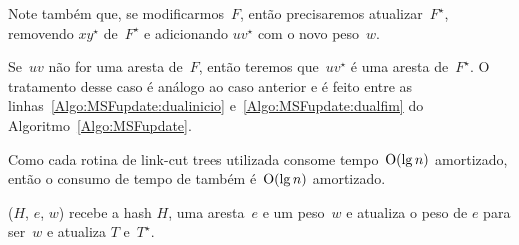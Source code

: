 Note também que, se modificarmos~$F$, então precisaremos atualizar~$F^\star$, removendo $xy^\star$ de~$F^\star$ e adicionando $uv^\star$ com o novo peso~$w$.

Se~$uv$ não for uma aresta de~$F$, então teremos que~$uv^\star$ é uma aresta de~$F^\star$.
O tratamento desse caso é análogo ao caso anterior e é feito entre as linhas~\ref{Algo:MSFupdate:dualinicio} e~\ref{Algo:MSFupdate:dualfim} do Algoritmo~\ref{Algo:MSFupdate}.

Como cada rotina de link-cut trees utilizada consome tempo~$\mathrm{O}(\lg n)$ amortizado, então o consumo de tempo de \MSFupdate{} também é~$\mathrm{O}(\lg n)$ amortizado.



\newpage
\MSFupdate($H$, $e$, $w$) recebe a hash $H$, uma aresta~$e$ e um peso~$w$ e atualiza o peso de $e$ para ser~$w$ e atualiza $T$ e~$T^\star$.

